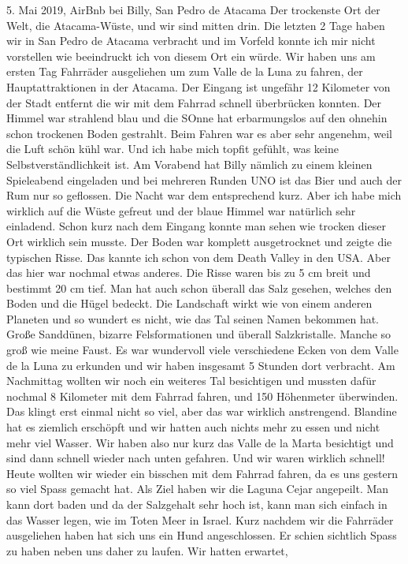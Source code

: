 \documentclass[11pt]{book}
\begin{document}
5. Mai 2019, AirBnb bei Billy, San Pedro de Atacama
Der trockenste Ort der Welt, die Atacama-Wüste, und wir sind mitten drin. Die letzten 2 Tage haben wir in San Pedro de Atacama verbracht und im Vorfeld 
konnte ich mir nicht vorstellen wie beeindruckt ich von diesem Ort ein würde. Wir haben uns am ersten Tag Fahrräder ausgeliehen um zum Valle de la Luna 
zu fahren, der Hauptattraktionen in der Atacama. Der Eingang ist ungefähr 12 Kilometer von der Stadt entfernt die wir mit dem Fahrrad schnell überbrücken 
konnten. Der Himmel war strahlend blau und die SOnne hat erbarmungslos auf den ohnehin schon trockenen Boden gestrahlt. Beim Fahren war es aber sehr 
angenehm, weil die Luft schön kühl war. Und ich habe mich topfit gefühlt, was keine Selbstverständlichkeit ist. Am Vorabend hat Billy nämlich zu einem 
kleinen Spieleabend eingeladen und bei mehreren Runden UNO ist das Bier und auch der Rum nur so geflossen. Die Nacht war dem entsprechend kurz. Aber ich 
habe mich wirklich auf die Wüste gefreut und der blaue Himmel war natürlich sehr einladend. Schon kurz nach dem Eingang konnte man sehen wie trocken 
dieser Ort wirklich sein musste. Der Boden war komplett ausgetrocknet und zeigte die typischen Risse. Das kannte ich schon von dem Death Valley in den
USA. Aber das hier war nochmal etwas anderes. Die Risse waren bis zu 5 cm breit und bestimmt 20 cm tief. Man hat auch schon überall das Salz gesehen, 
welches den Boden und die Hügel bedeckt. Die Landschaft wirkt wie von einem anderen Planeten und so wundert es nicht, wie das Tal seinen Namen bekommen 
hat. Große Sanddünen, bizarre Felsformationen und überall Salzkristalle. Manche so groß wie meine Faust. Es war wundervoll viele verschiedene Ecken 
von dem Valle de la Luna zu erkunden und wir haben insgesamt 5 Stunden dort verbracht. 
Am Nachmittag wollten wir noch ein weiteres Tal besichtigen und mussten dafür nochmal 8 Kilometer mit dem Fahrrad fahren, und 150 Höhenmeter überwinden. 
Das klingt erst einmal nicht so viel, aber das war wirklich anstrengend. Blandine hat es ziemlich erschöpft und wir hatten auch nichts mehr zu essen 
und nicht mehr viel Wasser. Wir haben also nur kurz das Valle de la Marta besichtigt und sind dann schnell wieder nach unten gefahren. Und wir waren 
wirklich schnell! 
Heute wollten wir wieder ein bisschen mit dem Fahrrad fahren, da es uns gestern so viel Spass gemacht hat. Als Ziel haben wir die Laguna Cejar angepeilt. 
Man kann dort baden und da der Salzgehalt sehr hoch ist, kann man sich einfach in das Wasser legen, wie im Toten Meer in Israel. Kurz nachdem wir 
die Fahrräder ausgeliehen haben hat sich uns ein Hund angeschlossen. Er schien sichtlich Spass zu haben neben uns daher zu laufen. Wir hatten erwartet, 
\end{document}
